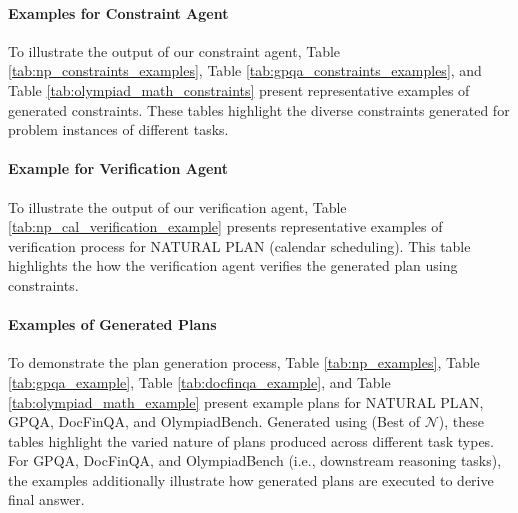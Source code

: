 \paragraph{Examples for Constraint Agent}
To illustrate the output of our constraint agent, Table \ref{tab:np_constraints_examples}, Table \ref{tab:gpqa_constraints_examples}, and Table \ref{tab:olympiad_math_constraints} present representative examples of generated constraints. These tables highlight the diverse constraints generated for problem instances of different tasks.



\paragraph{Example for Verification Agent}
To illustrate the output of our verification agent, Table \ref{tab:np_cal_verification_example} presents representative examples of verification process for NATURAL PLAN (calendar scheduling). This table highlights the how the verification agent verifies the generated plan using constraints.

\paragraph{Examples of Generated Plans}
To demonstrate the plan generation process, Table \ref{tab:np_examples}, Table \ref{tab:gpqa_example}, Table \ref{tab:docfinqa_example}, and Table \ref{tab:olympiad_math_example} present example plans for NATURAL PLAN, GPQA, DocFinQA, and OlympiadBench.  Generated using \plangen{} (Best of $\mathcal{N}$), these tables highlight the varied nature of plans produced across different task types. For GPQA, DocFinQA, and OlympiadBench (i.e., downstream reasoning tasks), the examples additionally illustrate how generated plans are executed to derive final answer. 
















